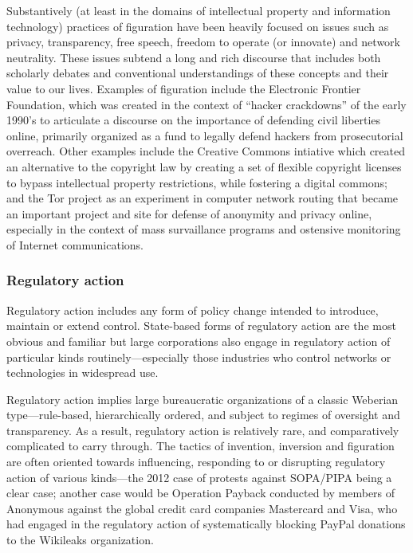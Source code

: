 \documentclass[10pt,letter,oneside]{scrartcl}
\begin{document}
Substantively (at least in the domains of intellectual property and information
technology) practices of figuration have been heavily focused on issues such as
privacy, transparency, free speech, freedom to operate (or innovate) and
network neutrality.   These issues subtend a long and rich discourse that
includes both scholarly debates and conventional understandings of these
concepts and their value to our lives. Examples of figuration include the
Electronic Frontier Foundation, which was created in the context of ``hacker
crackdowns'' of the early 1990's to articulate a discourse on the importance of
defending civil liberties online, primarily organized as a fund to legally
defend hackers from prosecutorial overreach. Other examples include the
Creative Commons intiative which created an alternative to the copyright law by
creating a set of flexible copyright licenses to bypass intellectual property
restrictions, while fostering a digital commons; and the Tor project as an
experiment in computer network routing that became an important project and
site for defense of anonymity and privacy online, especially in the context of
mass survaillance programs and ostensive monitoring of Internet communications.

\subsubsection{Regulatory action}

Regulatory action includes any form of policy change intended to introduce,
maintain or extend control.  State-based forms of regulatory action are the
most obvious and familiar but large corporations also engage in regulatory
action of particular kinds routinely---especially those industries who control
networks or technologies in widespread use.

Regulatory action implies large bureaucratic organizations of a classic
Weberian type---rule-based, hierarchically ordered, and subject to regimes of
oversight and transparency.  As a result, regulatory action is relatively rare,
and comparatively complicated to carry through.  The tactics of invention,
inversion and figuration are often oriented towards influencing, responding to
or disrupting regulatory action of various kinds---the 2012 case of protests
against SOPA/PIPA being a clear case; another case would be Operation Payback
conducted by members of Anonymous against the global credit card companies
Mastercard and Visa, who had engaged in the regulatory action of systematically
blocking PayPal donations to the Wikileaks organization. 
\end{document}
